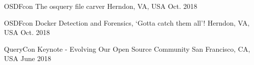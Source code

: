 


\begin{cvhonors}


\cvhonor
{OSDFcon} %
{The osquery file carver} %
{Herndon, VA, USA} %
{Oct. 2018} %


\cvhonor
{OSDFcon} %
{Docker Detection and Forensics, ‘Gotta catch them all’!} %
{Herndon, VA, USA} %
{Oct. 2018} %


\cvhonor
{QueryCon} %
{Keynote - Evolving Our Open Source Community} %
{San Francisco, CA, USA} %
{June 2018} %


\end{cvhonors}

